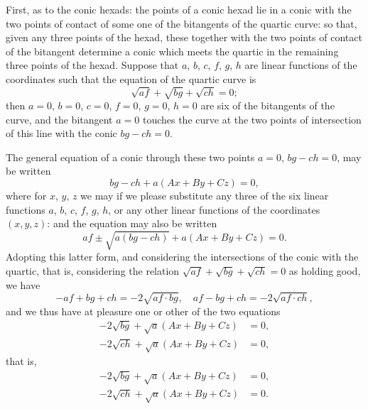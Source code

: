 \documentclass[11pt,a4paper]{book}
\begin{document}
\clearpage
First, as to the conic hexads: the points of a conic hexad lie in a conic with the two points of contact of some one of the bitangents of the quartic curve: so that, given any three points of the hexad, these together with the two points of contact of the bitangent determine a conic which meets the quartic in the remaining three points of the hexad. Suppose that $a$, $b$, $c$, $f$, $g$, $h$ are linear functions of the coordinates such that the equation of the quartic curve is
\[
\sqrt{af} + \sqrt{bg} + \sqrt{ch} = 0;
\]
then $a = 0$, $b = 0$, $c = 0$, $f = 0$, $g = 0$, $h = 0$ are six of the bitangents of the curve, and the bitangent $a = 0$ touches the curve at the two points of intersection of this line with the conic $bg - ch = 0$.

The general equation of a conic through these two points $a = 0$, $bg - ch = 0$, may be written
\[
bg - ch + a(Ax + By + Cz) = 0,
\]
where for $x$, $y$, $z$ we may if we please substitute any three of the six linear functions $a$, $b$, $c$, $f$, $g$, $h$, or any other linear functions of the coordinates $(x, y, z)$: and the equation may also be written
\[
af \pm \sqrt{a(bg - ch)} + a(Ax + By + Cz) = 0.
\]
Adopting this latter form, and considering the intersections of the conic with the quartic, that is, considering the relation $\sqrt{af} + \sqrt{bg} + \sqrt{ch} = 0$ as holding good, we have
\[
-af + bg + ch = -2\sqrt{af \cdot bg}, \quad af - bg + ch = -2\sqrt{af \cdot ch},
\]
and we thus have at pleasure one or other of the two equations
\begin{align*}
-2\sqrt{bg} + \sqrt{a}(Ax + By + Cz) &= 0, \\
-2\sqrt{ch} + \sqrt{a}(Ax + By + Cz) &= 0,
\end{align*}
that is,
\begin{align*}
-2\sqrt{bg} + \sqrt{a}(Ax + By + Cz) &= 0, \\
-2\sqrt{ch} + \sqrt{a}(Ax + By + Cz) &= 0.
\end{align*}
\end{document}
